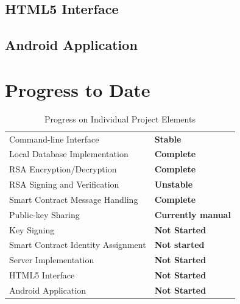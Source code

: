 \documentclass[titlepage]{report}
\begin{document}
\subsection{HTML5 Interface}

\subsection{Android Application}

\pagebreak

\section{Progress to Date}

\begin{table}[ht]
\begin{center}
\caption{Progress on Individual Project Elements}
\begin{tabular}{ | l | p{5cm} |}
\hline
Command-line Interface & \textbf{Stable} \\
Local Database Implementation & \textbf{Complete} \\
RSA Encryption/Decryption & \textbf{Complete} \\
RSA Signing and Verification & \textbf{Unstable} \\
Smart Contract Message Handling & \textbf{Complete} \\
\hline
Public-key Sharing & \textbf{Currently manual} \\
Key Signing & \textbf{Not Started} \\
\hline
Smart Contract Identity Assignment & \textbf{Not started} \\
Server Implementation & \textbf{Not Started} \\
HTML5 Interface & \textbf{Not Started} \\
Android Application & \textbf{Not Started} \\
\hline
\end{tabular}
\end{center}
\end{table}

\listoftables
\listoffigures
\printindex
\printglossaries{}
\printbibliography{}
\end{document}
